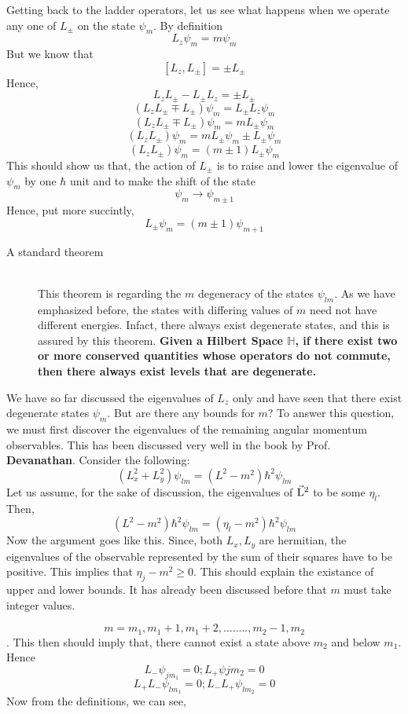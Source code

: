 \documentclass[12pt]{article}
\begin{document}
Getting back to the ladder operators, let us see what happens when we operate any one of $L_{\pm}$ on the state $\psi_m$. By definition $$L_z\psi_m = m\psi_m$$ But we know that $$[L_z, L_{\pm}] = \pm L_{\pm}$$ Hence,
$$L_zL_{\pm} - L_{\pm}L_z = \pm L_{\pm}$$
$$(L_zL_{\pm} \mp L_{\pm})\psi_m = L_{\pm}L_z\psi_m$$ 
$$(L_zL_{\pm} \mp L_{\pm})\psi_m = mL_{\pm}\psi_m$$
$$(L_zL_{\pm})\psi_m  = mL_{\pm}\psi_m\pm L_{\pm}\psi_m$$
$$(L_zL_{\pm})\psi_m = (m \pm 1)L_{\pm}\psi_m$$
This should show us that, the action of $L_{\pm}$ is to raise and lower the eigenvalue of $\psi_m$ by one $\hbar$ unit and to make the shift of the state $$\psi_m \to \psi_{m \pm 1}$$ Hence, put more succintly, $$L_{\pm}\psi_m = (m \pm 1)\psi_{m+1}$$

\begin{description}
\item[A standard theorem] \hfill \\
	This theorem is regarding the $m$ degeneracy of the states $\psi_{lm}$. As we have emphasized before, the states with differing values of $m$ need not have different energies. Infact, there always exist degenerate states, and this is assured by this theorem. \textbf{Given a Hilbert Space $\mathbb{H}$, if there exist two or more conserved quantities whose operators do not commute, then there always exist levels that are degenerate.} 
\end{description}
We have so far discussed the eigenvalues of $L_z$ only and have seen that there exist degenerate states $\psi_m$. But are there any bounds for $m$? To answer this question, we must first discover the eigenvalues of the remaining angular momentum observables. This has been discussed very well in the book by Prof. \textbf{Devanathan}. Consider the following:
$$(L_x^2 + L_y^2)\psi_{lm} = (L^2 - m^2)\hbar^2 \psi_{lm}$$
Let us assume, for the sake of discussion, the eigenvalues of \textbf{$\vec{\mathrm{L}}^2$} to be some $\eta_l$. Then,
$$ (L^2 - m^2)\hbar^2 \psi_{lm} = (\eta_l - m^2)\hbar^2\psi_{lm}$$
Now the argument goes like this. Since, both $L_x, L_y$ are hermitian, the eigenvalues of the observable represented by the sum of their squares have to be positive. This implies that $\eta_j - m^2 \geq 0$. This should explain the existance of upper and lower bounds. It has already been discussed before that $m$ must take integer values.

$$m = m_1, m_1 + 1, m_1 + 2, ........, m_2 - 1,m_2$$.
This then should imply that, there cannot exist a state above $m_2$ and below $m_1$. Hence $$L_-\psi_{jm_1} = 0; L_+\psi{jm_2} = 0$$
$$L_+L_-\psi_{lm_1} = 0; L_-L_+\psi_{lm_2}=0$$
Now from the definitions, we can see,
\end{document}
